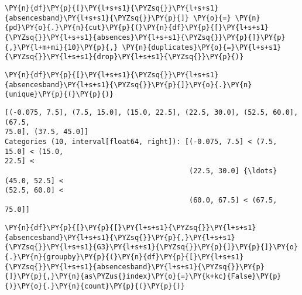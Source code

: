     \begin{tcolorbox}[breakable, size=fbox, boxrule=1pt, pad at break*=1mm,colback=cellbackground, colframe=cellborder]
\begin{Verbatim}[commandchars=\\\{\}]
\PY{n}{df}\PY{p}{[}\PY{l+s+s1}{\PYZsq{}}\PY{l+s+s1}{absencesband}\PY{l+s+s1}{\PYZsq{}}\PY{p}{]} \PY{o}{=} \PY{n}{pd}\PY{o}{.}\PY{n}{cut}\PY{p}{(}\PY{n}{df}\PY{p}{[}\PY{l+s+s1}{\PYZsq{}}\PY{l+s+s1}{absences}\PY{l+s+s1}{\PYZsq{}}\PY{p}{]}\PY{p}{,}\PY{l+m+mi}{10}\PY{p}{,} \PY{n}{duplicates}\PY{o}{=}\PY{l+s+s1}{\PYZsq{}}\PY{l+s+s1}{drop}\PY{l+s+s1}{\PYZsq{}}\PY{p}{)}
\end{Verbatim}
\end{tcolorbox}

    \begin{tcolorbox}[breakable, size=fbox, boxrule=1pt, pad at break*=1mm,colback=cellbackground, colframe=cellborder]
\begin{Verbatim}[commandchars=\\\{\}]
\PY{n}{df}\PY{p}{[}\PY{l+s+s1}{\PYZsq{}}\PY{l+s+s1}{absencesband}\PY{l+s+s1}{\PYZsq{}}\PY{p}{]}\PY{o}{.}\PY{n}{unique}\PY{p}{(}\PY{p}{)}
\end{Verbatim}
\end{tcolorbox}

            \begin{tcolorbox}[breakable, size=fbox, boxrule=.5pt, pad at break*=1mm, opacityfill=0]
\begin{Verbatim}[commandchars=\\\{\}]
[(-0.075, 7.5], (7.5, 15.0], (15.0, 22.5], (22.5, 30.0], (52.5, 60.0], (67.5,
75.0], (37.5, 45.0]]
Categories (10, interval[float64, right]): [(-0.075, 7.5] < (7.5, 15.0] < (15.0,
22.5] <
                                            (22.5, 30.0] {\ldots} (45.0, 52.5] <
(52.5, 60.0] <
                                            (60.0, 67.5] < (67.5, 75.0]]
\end{Verbatim}
\end{tcolorbox}
        
    \begin{tcolorbox}[breakable, size=fbox, boxrule=1pt, pad at break*=1mm,colback=cellbackground, colframe=cellborder]
\begin{Verbatim}[commandchars=\\\{\}]
\PY{n}{df}\PY{p}{[}\PY{p}{[}\PY{l+s+s1}{\PYZsq{}}\PY{l+s+s1}{absencesband}\PY{l+s+s1}{\PYZsq{}}\PY{p}{,}\PY{l+s+s1}{\PYZsq{}}\PY{l+s+s1}{G3}\PY{l+s+s1}{\PYZsq{}}\PY{p}{]}\PY{p}{]}\PY{o}{.}\PY{n}{groupby}\PY{p}{(}\PY{n}{df}\PY{p}{[}\PY{l+s+s1}{\PYZsq{}}\PY{l+s+s1}{absencesband}\PY{l+s+s1}{\PYZsq{}}\PY{p}{]}\PY{p}{,}\PY{n}{as\PYZus{}index}\PY{o}{=}\PY{k+kc}{False}\PY{p}{)}\PY{o}{.}\PY{n}{count}\PY{p}{(}\PY{p}{)}
\end{Verbatim}
\end{tcolorbox}

